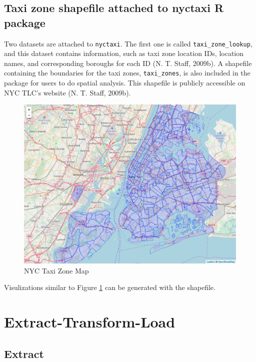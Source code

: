\documentclass[12pt,twoside]{reedthesis}
\theoremstyle{definition}
\theoremstyle{definition}
\theoremstyle{definition}
\theoremstyle{remark}
\begin{document}
\subsection{\texorpdfstring{Taxi zone shapefile attached to nyctaxi
\textbf{R}
package}{Taxi zone shapefile attached to nyctaxi R package}}\label{taxi-zone-shapefile-attached-to-nyctaxi-r-package}

Two datasets are attached to \texttt{nyctaxi}. The first one is called
\texttt{taxi\_zone\_lookup}, and this dataset contains information, such
as taxi zone location IDs, location names, and corresponding boroughs
for each ID (N. T. Staff, 2009b). A shapefile containing the boundaries
for the taxi zones, \texttt{taxi\_zones}, is also included in the
package for users to do spatial analysis. This shapefile is publicly
accessible on NYC TLC's website (N. T. Staff, 2009b).
\begin{figure}[h]

{\centering \includegraphics[width=5.84in]{figure/zonemap} 

}

\caption{NYC Taxi Zone Map}\label{fig:zonemap}
\end{figure}
Visulizations similar to Figure \ref{fig:zonemap} can be generated with
the shapefile.

\section{Extract-Transform-Load}\label{extract-transform-load}

\subsection{Extract}\label{extract}
\end{document}
